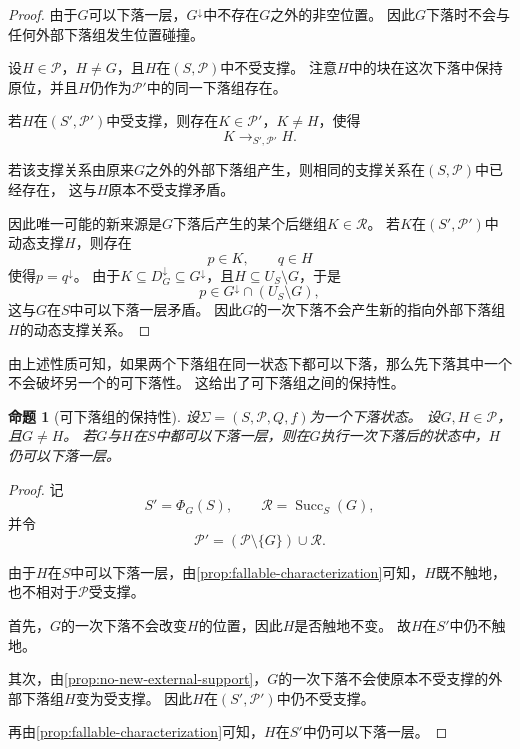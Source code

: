 \documentclass[UTF8,fontset=none]{ctexart}
\theoremstyle{cnthm}
\newtheorem{proposition}{命题}[section]
\begin{document}
			\begin{proof}
				由于$G$可以下落一层，$G^\downarrow$中不存在$G$之外的非空位置。
				因此$G$下落时不会与任何外部下落组发生位置碰撞。
				
				设$H\in\mathcal{P}$，$H\neq G$，且$H$在$(S,\mathcal{P})$中不受支撑。
				注意$H$中的块在这次下落中保持原位，并且$H$仍作为$\mathcal{P}'$中的同一下落组存在。
				
				若$H$在$(S',\mathcal{P}')$中受支撑，则存在$K\in\mathcal{P}'$，$K\neq H$，使得
				$$
				K\to_{S',\mathcal{P}'}H.
				$$
				
				若该支撑关系由原来$G$之外的外部下落组产生，则相同的支撑关系在$(S,\mathcal{P})$中已经存在，
				这与$H$原本不受支撑矛盾。
				
				因此唯一可能的新来源是$G$下落后产生的某个后继组$K\in\mathcal{R}$。
				若$K$在$(S',\mathcal{P}')$中动态支撑$H$，则存在
				$$
				p\in K,\qquad q\in H
				$$
				使得$p=q^\downarrow$。
				由于$K\subseteq D_G^\downarrow\subseteq G^\downarrow$，且$H\subseteq U_S\setminus G$，于是
				$$
				p\in G^\downarrow\cap(U_S\setminus G),
				$$
				这与$G$在$S$中可以下落一层矛盾。
				因此$G$的一次下落不会产生新的指向外部下落组$H$的动态支撑关系。
			\end{proof}
			
			由上述性质可知，如果两个下落组在同一状态下都可以下落，那么先下落其中一个不会破坏另一个的可下落性。
			这给出了可下落组之间的保持性。
			
			\begin{proposition}[可下落组的保持性]\label{prop:fallable-preservation}
				设$\Sigma=(S,\mathcal{P},Q,f)$为一个下落状态。
				设$G,H\in\mathcal{P}$，且$G\neq H$。
				若$G$与$H$在$S$中都可以下落一层，则在$G$执行一次下落后的状态中，$H$仍可以下落一层。
			\end{proposition}
			
			\begin{proof}
				记
				$$
				S'=\Phi_G(S),
				\qquad
				\mathcal{R}=\operatorname{Succ}_S(G),
				$$
				并令
				$$
				\mathcal{P}'=(\mathcal{P}\setminus\{G\})\cup\mathcal{R}.
				$$
				
				由于$H$在$S$中可以下落一层，由\cref{prop:fallable-characterization}可知，$H$既不触地，也不相对于$\mathcal{P}$受支撑。
				
				首先，$G$的一次下落不会改变$H$的位置，因此$H$是否触地不变。
				故$H$在$S'$中仍不触地。
				
				其次，由\cref{prop:no-new-external-support}，$G$的一次下落不会使原本不受支撑的外部下落组$H$变为受支撑。
				因此$H$在$(S',\mathcal{P}')$中仍不受支撑。
				
				再由\cref{prop:fallable-characterization}可知，$H$在$S'$中仍可以下落一层。
			\end{proof}
			
\end{document}
